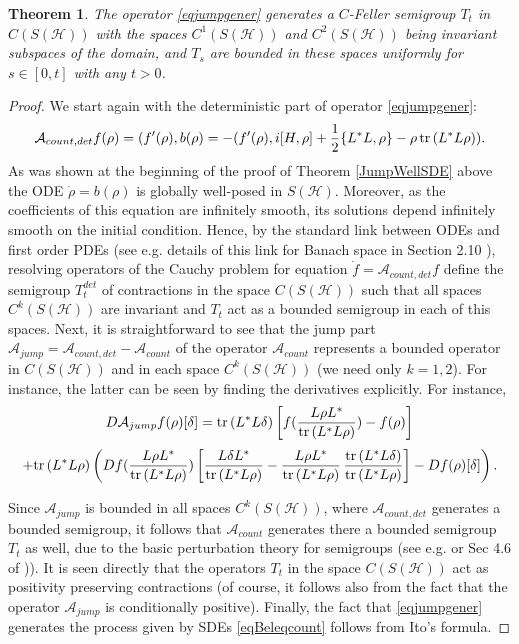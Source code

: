 \documentclass[12pt]{article}
\def\AC{\mathcal{A}}
\def\HC{\mathcal{H}}
\def\tr{\rm{tr}}
\def\de{\delta}
\newtheorem{theorem}{Theorem}[section]
\begin{document}
\begin{theorem}
\label{JumpWellPDE}
The operator  \eqref{eqjumpgener} generates a
$C$-Feller semigroup $T_t$ in $C(S(\HC))$ with the spaces
 $C^1(S(\HC))$ and $C^2(S(\HC))$ being invariant subspaces of the domain,
 and $T_s$ are bounded in these spaces
 uniformly for $s\in [0,t]$ with any $t>0$.
\end{theorem}


\begin{proof}
We start again with the deterministic part of
operator \eqref{eqjumpgener}:
\[
\AC_{count, det}f(\rho)=(f'(\rho), b(\rho)=-(f'(\rho), i[H, \rho]
+ \frac12 \{L^*L,\rho\}-\rho \, {\tr}\, (L^*L\rho)).
\]
As was shown at the beginning of the proof of Theorem \ref{JumpWellSDE} above the ODE
$\dot \rho=b(\rho)$ is globally well-posed in $S(\HC)$. Moreover, as the coefficients
of this equation are infinitely smooth, its solutions
depend infinitely smooth on the initial condition. Hence, by the standard link between ODEs and
first order PDEs (see e.g. details of this link for Banach space in Section 2.10 \cite{Kolbook19}),
resolving operators of the Cauchy problem for equation $\dot f=\AC_{count,det}f$ define the semigroup
$T_t^{det}$ of contractions in the space $C(S(\HC))$ such that all spaces $C^k(S(\HC))$ are invariant and
$T_t$ act as a bounded semigroup in each of this spaces.  Next, it is straightforward to see that
the jump part $\AC_{jump}=\AC_{count, det}-\AC_{count}$ of the operator $\AC_{count}$ represents a
bounded operator in $C(S(\HC))$ and in each space $C^k(S(\HC))$ (we need only $k=1,2$). For instance,
the latter can be seen by finding the derivatives explicitly. For instance,
\[
D\AC_{jump}f(\rho)[\de]
= {\tr}\, (L^*L\de)\left[f(\frac{L\rho L^*}{{\tr}\, (L^*L\rho)})-f(\rho)\right]
\]
\[
+{\tr}\, (L^*L\rho)\left(Df(\frac{L\rho L^*}{{\tr}\, (L^*L\rho)})
\left[ \frac{L\de L^*}{{\tr}\, (L^*L\rho)}-\frac{L\rho L^*}{{\tr}\, (L^*L\rho)}\,
\frac{{\tr}\, (L^*L\de)}{{\tr}\, (L^*L\rho)} \right]
-Df(\rho)[\de]\right).
\]

Since $\AC_{jump}$ is bounded in all spaces $C^k(S(\HC))$, where $\AC_{count,det}$ generates a bounded semigroup,
it follows that $\AC_{count}$ generates there a bounded semigroup $T_t$ as well, due to the basic perturbation theory for
semigroups (see e.g. \cite{ReedSimon} or Sec 4.6 of \cite{Kolbook19})). It is seen directly that the operators $T_t$
in the space $C(S(\HC))$ act as positivity preserving contractions (of course, it follows also from
the fact that the operator $\AC_{jump}$ is conditionally positive).
Finally, the fact that  \eqref{eqjumpgener} generates the process given
by SDEs  \eqref{eqBeleqcount} follows from Ito's formula.
\end{proof}
\end{document}
